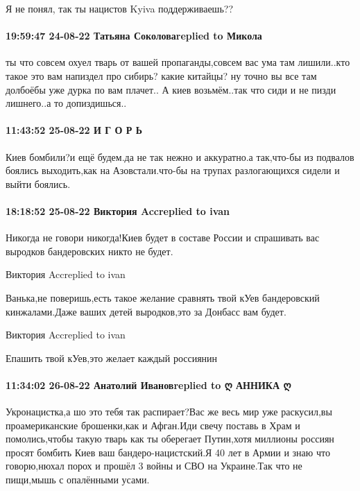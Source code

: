 Я не понял, так ты нацистов Kyiva поддерживаешь??

\paragraph{19:59:47 24-08-22 Татьяна Соколоваreplied to Микола}



ты что совсем охуел тварь от вашей пропаганды,совсем вас ума там лишили..кто
такое это вам напиздел про сибирь? какие китайцы? ну точно вы все там долбоёбы
уже дурка по вам плачет.. А киев возьмём..так что сиди и не пизди лишнего..а то
допиздишься..

\paragraph{11:43:52 25-08-22 И Г О Р Ь}

Киев бомбили?и ещё будем.да не так нежно и аккуратно.а так,что-бы из подвалов
боялись выходить,как на Азовстали.что-бы на трупах разлогающихся сидели и выйти
боялись.

\paragraph{18:18:52 25-08-22 Виктория Accreplied to ivan}

Никогда не говори никогда!Киев будет в составе России и спрашивать вас выродков
бандеровских никто не будет.

Виктория Accreplied to ivan

Ванька,не поверишь,есть такое желание сравнять твой кУев бандеровский
кинжалами.Даже ваших детей выродков,это за Донбасс вам будет.

Виктория Accreplied to ivan

Епашить твой кУев,это желает каждый россиянин

\paragraph{11:34:02 26-08-22 Анатолий Ивановreplied to ღ АННИКА ღ}

Укронацистка,а шо это тебя так распирает?Вас же весь мир уже раскусил,вы
проамериканские брошенки,как и Афган.Иди свечу поставь в Храм и помолись,чтобы
такую тварь как ты оберегает Путин,хотя миллионы россиян просят бомбить Киев
ваш бандеро-нацистский.Я 40 лет в Армии и знаю что говорю,нюхал порох и прошёл
3 войны и СВО на Украине.Так что не пищи,мышь с опалёнными усами.


